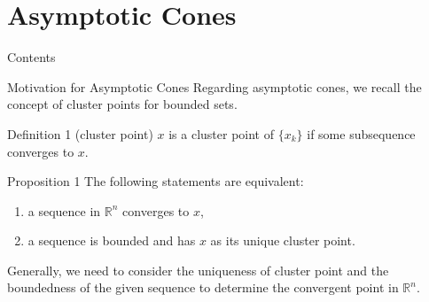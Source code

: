 \documentclass[aspectratio=169, dvipdfmx, 11pt]{beamer} %
\newcommand{\NDemenstionalRealEuclidianSpace}{\mathbb{R}^n}
\begin{document}
\section{Asymptotic Cones}
\begin{frame}{Contents}
    \tableofcontents[currentsection]
\end{frame}

\begin{frame}{Motivation for Asymptotic Cones}
    Regarding asymptotic cones, we recall the concept of cluster points for bounded sets.

    \begin{block}{Definition 1 (cluster point)}
    $x$ is a cluster point of $\{ x_k \}$ if some subsequence converges to $x$.
    \end{block}

    \begin{block}{Proposition 1}
    The following statements are equivalent:

    \begin{enumerate}[i]
        \item a sequence in $\NDemenstionalRealEuclidianSpace$ converges to $x$,
        \item a sequence is bounded and has $x$ as its unique cluster point.
    \end{enumerate}
    \end{block}

    Generally, we need to consider the uniqueness of cluster point and the boundedness of the given sequence to determine the convergent point in $\NDemenstionalRealEuclidianSpace$.
\end{frame}
\end{document}
